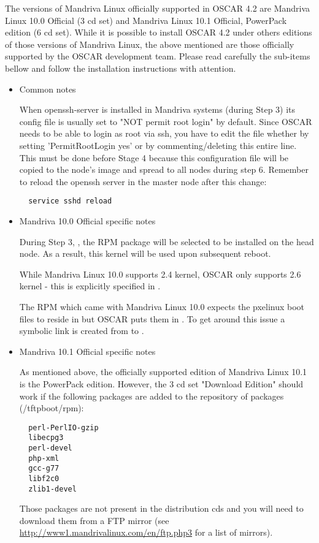 The versions of Mandriva Linux officially supported in OSCAR 4.2 are
Mandriva Linux 10.0 Official (3 cd set) and Mandriva Linux 10.1 Official, 
PowerPack edition (6 cd set). While it is possible to install OSCAR 4.2 under 
others editions of those versions of Mandriva Linux, the above mentioned are
those officially supported by the OSCAR development team. Please read 
carefully the sub-items bellow and follow the installation instructions
with attention. 

\begin{itemize}

\item Common notes

When openssh-server is installed in Mandriva systems (during Step 3)
its config file is usually set to "NOT permit root login" by default.
Since OSCAR needs to be able to login as root via ssh, you have to edit the
file  whether by setting 
'PermitRootLogin yes' or by commenting/deleting this entire line. This must 
be done before Stage 4 because this configuration file will be copied to the 
node's image and spread to all nodes during step 6. Remember to reload
the openssh server in the master node after this change:
\begin{verbatim}
  service sshd reload
\end{verbatim}

\item Mandriva 10.0 Official specific notes

During Step 3, , the RPM package
 will be selected to be installed on the head node.
As a result, this kernel will be used upon subsequent reboot.

While Mandriva Linux 10.0 supports 2.4 kernel, OSCAR only supports
2.6 kernel - this is explicitly specified in
.

The  RPM which came with Mandriva Linux 10.0 expects the
pxelinux boot files to reside in  but OSCAR puts
them in .  To get around this issue a symbolic link is
created from  to .


\item Mandriva 10.1 Official specific notes

As mentioned above, the officially supported edition of Mandriva Linux 10.1
is the PowerPack edition. However, the 3 cd set "Download Edition"
should work if the following packages are added to the repository of 
packages (/tftpboot/rpm):
\begin{verbatim}
  perl-PerlIO-gzip
  libecpg3
  perl-devel
  php-xml
  gcc-g77
  libf2c0
  zlib1-devel
\end{verbatim} 
Those packages are not present in the distribution cds and you will need to
download them from a FTP mirror (see \url{http://www1.mandrivalinux.com/en/ftp.php3}
for a list of mirrors).


\end{itemize}
